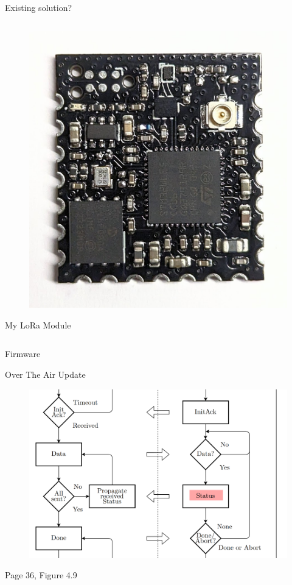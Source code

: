 \documentclass{beamer}
\begin{document}
\begin{frame}{Existing solution?}
\begin{columns}
\begin{column}{.4\textwidth}
\begin{figure}
        \includegraphics[width=\linewidth]{img/module-v0.1.jpg}
    \end{figure}
    My LoRa Module
\end{column}
\end{columns}
\end{frame}


\begin{frame}{Firmware}
\begin{figure}
    \centering
    
\end{figure}
\end{frame}


\begin{frame}{Over The Air Update}
\begin{figure}
    \centering
    \includegraphics[width=\linewidth]{img/ota.png}
\end{figure}
\begin{flushright}
    Page 36, Figure 4.9
\end{flushright}
\end{frame}
\end{document}
